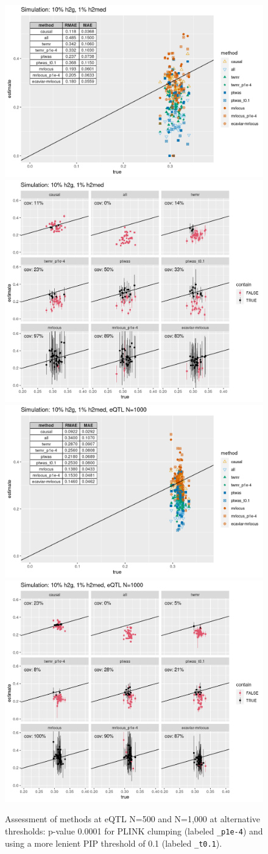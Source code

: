 \documentclass[11pt]{article}
\begin{document}
\begin{figure}[!ht]
  \centering
  \includegraphics[width=.52\textwidth]{figs/sim1extra.png}
  \includegraphics[width=.4\textwidth]{figs/cover1extra.png} \\
  \includegraphics[width=.52\textwidth]{figs/simhigh_nextra.png}
  \includegraphics[width=.4\textwidth]{figs/coverhigh_nextra.png}
  \caption{Assessment of methods at eQTL N=500 and N=1,000 at
    alternative thresholds: p-value 0.0001 for PLINK clumping
    (labeled \texttt{\_p1e-4}) and using a more lenient PIP threshold
    of 0.1 (labeled \texttt{\_t0.1}).}
\end{figure}
\end{document}
